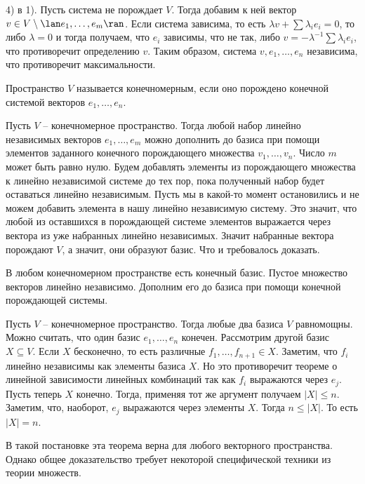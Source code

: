 4) в 1). Пусть система не порождает $V$. Тогда добавим к ней вектор $v \in V\setminus \lan e_1,\dots,e_m \ran$. Если система зависима, то есть $\lambda v+ \sum \lambda_i e_i=0$, то либо $\lambda=0$ и тогда получаем, что $e_i$ зависимы, что не так, либо $v=-\lambda^{-1} \sum \lambda_i e_i$, что противоречит определению $v$. Таким образом, система $v,e_1,\dots, e_n$ независима, что противоречит максимальности.
\endproof
\elm

\dfn Пространство $V$ называется конечномерным, если оно порождено конечной системой векторов $e_1,\dots,e_n$.
\edfn

 Пусть $V$ -- конечномерное пространство. Тогда любой набор линейно независимых векторов $e_1,\dots,e_m$ можно дополнить до базиса при помощи элементов заданного конечного порождающего множества $v_1,\dots,v_n$. Число $m$ может быть равно нулю.
\proof Будем добавлять элементы из порождающего множества к линейно независимой системе до тех пор, пока полученный набор будет оставаться линейно независимым. Пусть мы в какой-то момент остановились и не можем добавить элемента в нашу линейно независимую систему. Это значит, что любой из оставшихся в порождающей системе элементов выражается через вектора из уже набранных линейно независимых. Значит набранные вектора порождают $V$, а значит, они образуют базис. Что и требовалось доказать.
\endproof
\ethrm

\crl В любом конечномерном пространстве есть конечный базис.
\proof Пустое множество векторов линейно независимо. Дополним его до базиса при помощи конечной порождающей системы.
\endproof
\ecrl


 Пусть $V$ -- конечномерное пространство. Тогда любые два базиса $V$  равномощны.
\proof Можно считать, что один базис $e_1,\dots,e_n$ конечен. Рассмотрим другой базис $X \subseteq V$. Если $X$ бесконечно, то есть различные $f_1,\dots,f_{n+1}\in X$. Заметим, что $f_i$ линейно независимы как элементы базиса $X$. Но это противоречит  теореме о линейной зависимости линейных комбинаций так как $f_i$  выражаются через $e_j$. Пусть теперь $X$ конечно. Тогда, применяя тот же аргумент получаем $|X|\leq n$. Заметим, что, наоборот,  $e_j$ выражаются через элементы $X$. Тогда $n\leq |X|$. То есть $|X|=n$.
\endproof
\ethrm

\rm В такой постановке эта теорема верна для любого векторного пространства. Однако общее доказательство требует некоторой специфической техники из теории множеств.
\erm



